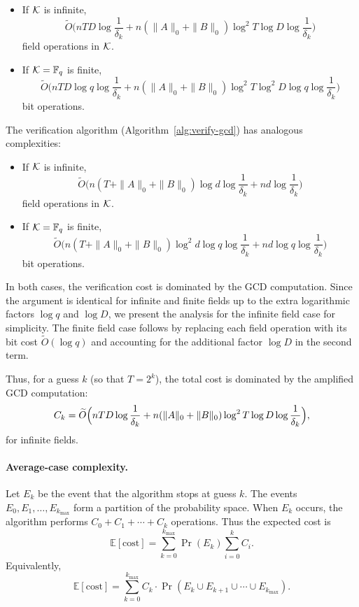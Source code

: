 \documentclass{article}
\numberwithin{equation}{section}
\begin{document}
\begin{itemize}
    \item If ${\mathcal{K}}$ is infinite,
    \[
    \widetilde{O}\bigl( n T D \log\frac{1}{\delta_k}+ n(\|A\|_0 + \|B\|_0) \log^2 T \log D \log\frac{1}{\delta_k}\bigr)
    \]
    field operations in ${\mathcal{K}}$.

    \item If ${\mathcal{K}} = \mathbb{F}_q$ is finite,
    \[
    \widetilde{O}\bigl( n T D \log q \log\frac{1}{\delta_k}+ n(\|A\|_0 + \|B\|_0) \log^2 T \log^2 D \log q \log\frac{1}{\delta_k}\bigr)
    \]
    bit operations.
\end{itemize}

The verification algorithm (Algorithm~\ref{alg:verify-gcd}) has analogous complexities:

\begin{itemize}
    \item If ${\mathcal{K}}$ is infinite,
    \[
    \widetilde{O}\bigl( n(T+\|A\|_0+\|B\|_0) \log d \log\frac{1}{\delta_k}+ n d \log\frac{1}{\delta_k}\bigr)
    \]
    field operations in ${\mathcal{K}}$.

    \item If ${\mathcal{K}} = \mathbb{F}_q$ is finite,
    \[
    \widetilde{O}\bigl( n(T+\|A\|_0+\|B\|_0) \log^2 d \log q \log\frac{1}{\delta_k}+ n d \log q \log\frac{1}{\delta_k}\bigr)
    \]
    bit operations.
\end{itemize}

In both cases, the verification cost is dominated by the GCD computation. Since the argument is identical for infinite and finite fields up to the extra logarithmic factors $\log q$ and $\log D$, we present the analysis for the infinite field case for simplicity. The finite field case follows by replacing each field operation with its bit cost $\widetilde{O}(\log q)$ and accounting for the additional factor $\log D$ in the second term.

Thus, for a guess $k$ (so that $T = 2^k$), the total cost is dominated by the amplified GCD computation:
\[
C_k = \widetilde{O}\Bigl( n T D \log\frac{1}{\delta_k}+ n(\|A\|_0 + \|B\|_0) \log^2 T \log D \log\frac{1}{\delta_k}\Bigr),
\]
for infinite fields.

\paragraph{Average-case complexity.}
Let $E_k$ be the event that the algorithm stops at guess $k$. The events $E_0, E_1, \dots, E_{k_{\max}}$ form a partition of the probability space. When $E_k$ occurs, the algorithm performs $C_0 + C_1 + \cdots + C_k$ operations. Thus the expected cost is
\[
\mathbb{E}[\text{cost}]
= \sum_{k=0}^{k_{\max}} \Pr(E_k) \sum_{i=0}^{k} C_i.
\]
Equivalently,
\[
\mathbb{E}[\text{cost}]
= \sum_{k=0}^{k_{\max}} C_k \cdot \Pr(E_k \cup E_{k+1} \cup \cdots \cup E_{k_{\max}}).
\]
\end{document}
